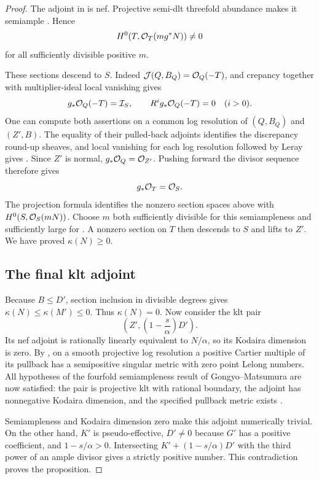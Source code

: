 \begin{proof}
The adjoint in  is nef.
Projective semi-dlt threefold abundance makes it semiample
\cite[Corollary~4.10]{Fujino2000}. Hence
\[
 H^0(T,\mathcal O_T(mg^*N))\ne0
\]
for all sufficiently divisible positive $m$.

These sections descend to $S$. Indeed
$\mathcal J(Q,B_Q)=\mathcal O_Q(-T)$, and crepancy together with multiplier-ideal
local vanishing gives
\begin{equation}
\label{eq:signed-floor-pushforward}
 g_*\mathcal O_Q(-T)=\mathcal I_S,\qquad
 R^i g_*\mathcal O_Q(-T)=0\quad(i>0).
\end{equation}
One can compute both assertions on a common log resolution of
$(Q,B_Q)$ and $(Z',B)$. The equality of their pulled-back adjoints
identifies the discrepancy round-up sheaves, and local vanishing
for each log resolution followed by Leray gives
. Since $Z'$ is normal,
$g_*\mathcal O_Q=\mathcal O_{Z'}$. Pushing forward the divisor sequence therefore
gives
\[
 g_*\mathcal O_T=\mathcal O_S.
\]
The projection formula identifies the nonzero section spaces above
with $H^0(S,\mathcal O_S(mN))$. Choose $m$ both sufficiently divisible
for this semiampleness and sufficiently large for
. A nonzero section on $T$
then descends to $S$ and lifts to $Z'$. We have proved
$\kappa(N)\geq0$.

\subsection*{The final klt adjoint}

Because $B\leq D'$, section inclusion in divisible degrees gives
$\kappa(N)\leq\kappa(M')\leq0$. Thus $\kappa(N)=0$.
Now consider the klt pair
\[
 \left(Z',\left(1-\frac{s}{\alpha}\right)D'\right).
\]
Its nef adjoint is rationally linearly equivalent to $N/\alpha$,
so its Kodaira dimension is zero. By
, on a smooth projective log resolution
a positive Cartier multiple of its pullback has a semipositive
singular metric with zero point Lelong numbers. All hypotheses of
the fourfold semiampleness result of Gongyo--Matsumura are now
satisfied: the pair is projective klt with rational boundary, the
adjoint has nonnegative Kodaira dimension, and the specified
pullback metric exists
\cite[Corollary~5.3]{GongyoMatsumura2017}.

Semiampleness and Kodaira dimension zero make this adjoint
numerically trivial. On the other hand, $K'$ is pseudo-effective,
$D'\ne0$ because $G'$ has a positive coefficient, and
$1-s/\alpha>0$. Intersecting
$K'+(1-s/\alpha)D'$ with the third power of an ample divisor gives
a strictly positive number. This contradiction proves the
proposition.
\end{proof}
